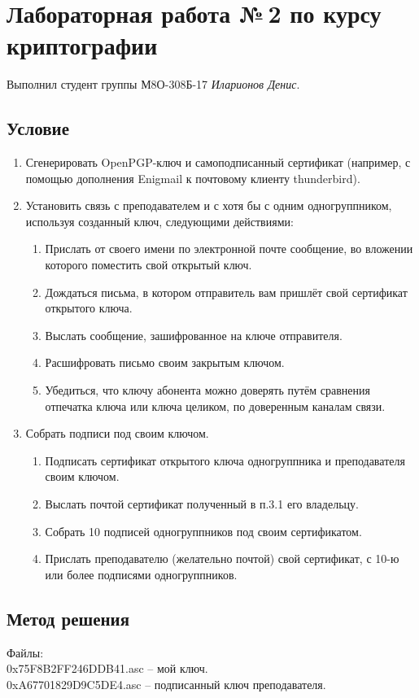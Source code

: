 \documentclass[12pt]{article}
\begin{document}
\section*{Лабораторная работа №\,2 по курсу криптографии}

Выполнил студент группы М8О-308Б-17 \textit{Иларионов Денис}.

\subsection*{Условие}

\begin{enumerate} 
\item Сгенерировать OpenPGP-ключ и самоподписанный сертификат (например, с помощью дополнения Enigmail к почтовому клиенту thunderbird).
\item Установить связь с преподавателем и с хотя бы с одним одногруппником, используя созданный ключ, следующими действиями:
\begin{enumerate} 
\item Прислать от своего имени по электронной почте сообщение, во вложении которого поместить свой открытый ключ.
\item Дождаться письма, в котором отправитель вам пришлёт свой сертификат открытого ключа.
\item Выслать сообщение, зашифрованное на ключе отправителя.
\item Расшифровать письмо своим закрытым ключом.
\item Убедиться, что ключу абонента можно доверять путём сравнения отпечатка ключа или ключа целиком, по доверенным каналам связи.
\end{enumerate} 
\item Собрать подписи под своим ключом.
\begin{enumerate}
\item Подписать сертификат открытого ключа одногруппника и преподавателя своим ключом.
\item Выслать почтой сертификат полученный в п.3.1 его владельцу.
\item Собрать 10 подписей одногруппников под своим сертификатом.
\item Прислать преподавателю (желательно почтой) свой сертификат, с 10-ю или более подписями одногруппников.
\end{enumerate}
\end{enumerate}


\subsection*{Метод решения}
Файлы:\\
0x75F8B2FF246DDB41.asc -- мой ключ.\\
0xA67701829D9C5DE4.asc -- подписанный ключ преподавателя.\\
\newpage
\end{document}
